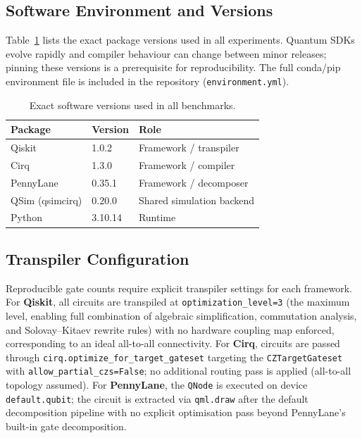 \subsection{Software Environment and Versions}

Table~\ref{tab:versions} lists the exact package versions used in all
experiments.
Quantum SDKs evolve rapidly and compiler behaviour can change between
minor releases; pinning these versions is a prerequisite for
reproducibility.
The full conda/pip environment file is included in the repository
(\texttt{environment.yml}).

\begin{table}[t]
\caption{Exact software versions used in all benchmarks.}
\label{tab:versions}
\centering
\begin{tabular}{lll}
\toprule
\textbf{Package}          & \textbf{Version} & \textbf{Role} \\
\midrule
Qiskit                    & 1.0.2            & Framework / transpiler \\
Cirq                      & 1.3.0            & Framework / compiler \\
PennyLane                 & 0.35.1           & Framework / decomposer \\
QSim (qsimcirq)           & 0.20.0           & Shared simulation backend \\
Python                    & 3.10.14          & Runtime \\
\bottomrule
\end{tabular}
\end{table}

\subsection{Transpiler Configuration}

Reproducible gate counts require explicit transpiler settings for each
framework.
For \textbf{Qiskit}, all circuits are transpiled at
\texttt{optimization\_level=3} (the maximum level, enabling full
combination of algebraic simplification, commutation analysis, and
Solovay--Kitaev rewrite rules) with no hardware coupling map enforced,
corresponding to an ideal all-to-all connectivity.
For \textbf{Cirq}, circuits are passed through
\texttt{cirq.optimize\_for\_target\_gateset} targeting the
\texttt{CZTargetGateset} with \texttt{allow\_partial\_czs=False};
no additional routing pass is applied (all-to-all topology assumed).
For \textbf{PennyLane}, the \texttt{QNode} is executed on device
\texttt{default.qubit}; the circuit is extracted via \texttt{qml.draw}
after the default decomposition pipeline with no explicit optimisation
pass beyond PennyLane's built-in gate decomposition.

